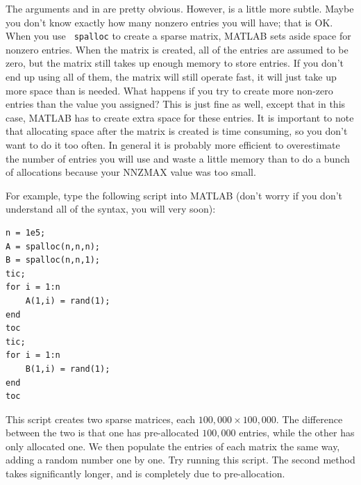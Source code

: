 The arguments  and  in  are pretty obvious. However,
 is a little more subtle. Maybe you don't know exactly how
many nonzero entries you will have; that is OK. When you use {\tt
spalloc} to create a sparse matrix, MATLAB sets aside space for
 nonzero entries. When the matrix is created, all of the
entries are assumed to be zero, but the matrix still takes up enough
memory to store  entries. If you don't end up using all of
them, the matrix will still operate fast, it will just take up more
space than is needed. What happens if you try to create more
non-zero entries than the  value you assigned? This is just
fine as well, except that in this case, MATLAB has to create extra
space for these entries. It is important to note that allocating
space after the matrix is created is time consuming, so you
don't want to do it too often. In general it is probably more
efficient to overestimate the number of entries you will use and
waste a little memory than to do a bunch of allocations because your
NNZMAX value was too small.

For example, type the following script into MATLAB (don't worry if you don't understand all of the syntax, you will very soon):

\begin{lstlisting}[style=matlab]
n = 1e5;
A = spalloc(n,n,n);
B = spalloc(n,n,1);
tic;
for i = 1:n
    A(1,i) = rand(1);
end
toc
tic;
for i = 1:n
    B(1,i) = rand(1);
end
toc
\end{lstlisting}

This script creates two sparse matrices, each $100,\!000 \times 100,\!000$. The difference between the two is that one has pre-allocated $100,\!000$ entries, while the other has only allocated one. We then populate the entries of each matrix the same way, adding a random number one by one. Try running this script. The second method takes significantly longer, and is completely due to pre-allocation.
